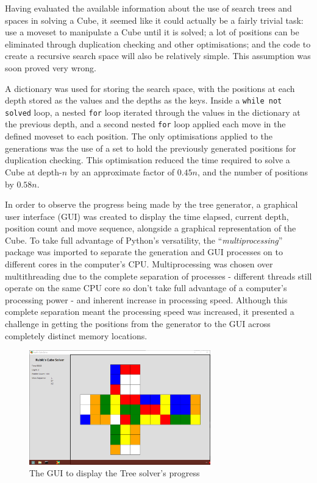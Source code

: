 \documentclass{report}
\newcommand{\tit}[1]{\textit{#1}}
\newcommand{\propernoun}[1]{\enquote{\tit{#1}}}
\newcommand{\depth}[1]{depth-#1}
\begin{document}
    Having evaluated the available information about the use of search trees and spaces in solving a Cube, it seemed like it could actually be a fairly trivial task: use a moveset to manipulate a Cube until it is solved; a lot of positions can be eliminated through duplication checking and other optimisations; and the code to create a recursive search space will also be relatively simple. This assumption was soon proved very wrong.
    
    A dictionary was used for storing the search space, with the positions at each depth stored as the values and the depths as the keys. Inside a \lstinline|while not solved| loop, a nested \lstinline|for| loop iterated through the values in the dictionary at the previous depth, and a second nested \lstinline|for| loop applied each move in the defined moveset to each position. The only optimisations applied to the generations was the use of a set to hold the previously generated positions for duplication checking. This optimisation reduced the time required to solve a Cube at \depth{$n$} by an approximate factor of $0.45n$, and the number of positions by $0.58n$.
    
    In order to observe the progress being made by the tree generator, a graphical user interface (GUI) was created to display the time elapsed, current depth, position count and move sequence, alongside a graphical representation of the Cube. To take full advantage of Python's versatility, the \propernoun{multiprocessing} package was imported to separate the generation and GUI processes on to different cores in the computer's CPU. Multiprocessing was chosen over multithreading due to the complete separation of processes - different threads still operate on the same CPU core so don't take full advantage of a computer's processing power - and inherent increase in processing speed. Although this complete separation meant the processing speed was increased, it presented a challenge in getting the positions from the generator to the GUI across completely distinct memory locations.
    
   	\begin{figure}[H]
    	\centering
    	\includegraphics[width=0.7\textwidth]{Resources/Images/imgTreeSolveGUI}
    	\caption{The GUI to display the Tree solver's progress}
    	\label{fig:imgTreeSolveGUI}
    \end{figure}
    
\end{document}
